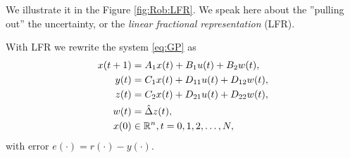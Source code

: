 We illustrate it in the Figure \ref{fig:Rob:LFR}. 
We speak here about the ''pulling out'' the uncertainty, or the \textit{linear fractional representation} (LFR). 


With LFR we rewrite the system \eqref{eq:GP} as 
\begin{align}
\label{eq:uncABCD}
\begin{split}
x(t+1) &= A_1 x(t) + B_1 u(t) + B_2 w(t), \\
y(t)   &= C_1x(t) + D_{11} u(t) + D_{12} w(t), \\
z(t)   &= C_2x(t) + D_{21} u(t) + D_{22}w(t),\\
w(t) &= \hat{\Delta} z(t),\\
x(0)& \in {\mathbb{R}}^{n}, t = 0,1,2, \dots, N, 
\end{split}
\end{align}
with error $e(\cdot) = r(\cdot) - y(\cdot)$. 


